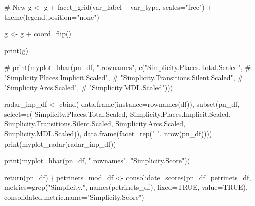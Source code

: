 \documentclass[]{article}
\newenvironment{Shaded}{\begin{snugshade}}{\end{snugshade}}
\newcommand{\KeywordTok}[1]{\textcolor[rgb]{0.94,0.87,0.69}{{#1}}}
\newcommand{\DataTypeTok}[1]{\textcolor[rgb]{0.87,0.87,0.75}{{#1}}}
\newcommand{\StringTok}[1]{\textcolor[rgb]{0.80,0.58,0.58}{{#1}}}
\newcommand{\CommentTok}[1]{\textcolor[rgb]{0.50,0.62,0.50}{{#1}}}
\newcommand{\OtherTok}[1]{\textcolor[rgb]{0.94,0.94,0.56}{{#1}}}
\newcommand{\NormalTok}[1]{\textcolor[rgb]{0.80,0.80,0.80}{{#1}}}
\begin{document}
\begin{Shaded}
\begin{Highlighting}[]
    \CommentTok{# New}
    \NormalTok{g <-}\StringTok{ }\NormalTok{g +}\StringTok{ }\KeywordTok{facet_grid}\NormalTok{(var_label ~}\StringTok{ }\NormalTok{var_type, }\DataTypeTok{scales=}\StringTok{"free"}\NormalTok{) +}\StringTok{ }
\StringTok{             }\KeywordTok{theme}\NormalTok{(}\DataTypeTok{legend.position=}\StringTok{"none"}\NormalTok{)}
    
    \NormalTok{g <-}\StringTok{ }\NormalTok{g +}\StringTok{ }\KeywordTok{coord_flip}\NormalTok{()}

    \KeywordTok{print}\NormalTok{(g)}

\CommentTok{#     print(myplot_hbar(pn_df, ".rownames", c("Simplicity.Places.Total.Scaled",}
\CommentTok{#                                             "Simplicity.Places.Implicit.Scaled",}
\CommentTok{#                                             "Simplicity.Transitions.Silent.Scaled",}
\CommentTok{#                                             "Simplicity.Arcs.Scaled",}
\CommentTok{#                                             "Simplicity.MDL.Scaled")))}

    \NormalTok{radar_inp_df <-}\StringTok{ }\KeywordTok{cbind}\NormalTok{( }\KeywordTok{data.frame}\NormalTok{(}\DataTypeTok{instance=}\KeywordTok{rownames}\NormalTok{(df)),}
                                    \KeywordTok{subset}\NormalTok{(pn_df, }\DataTypeTok{select=}\KeywordTok{c}\NormalTok{( }
                                        \NormalTok{Simplicity.Places.Total.Scaled,}
                                        \NormalTok{Simplicity.Places.Implicit.Scaled,}
                                        \NormalTok{Simplicity.Transitions.Silent.Scaled,}
                                        \NormalTok{Simplicity.Arcs.Scaled,}
                                        \NormalTok{Simplicity.MDL.Scaled)),}
                                    \KeywordTok{data.frame}\NormalTok{(}\DataTypeTok{facet=}\KeywordTok{rep}\NormalTok{(}\StringTok{" "}\NormalTok{, }\KeywordTok{nrow}\NormalTok{(pn_df))))}
    \KeywordTok{print}\NormalTok{(}\KeywordTok{myplot_radar}\NormalTok{(radar_inp_df))}

    \KeywordTok{print}\NormalTok{(}\KeywordTok{myplot_hbar}\NormalTok{(pn_df, }\StringTok{".rownames"}\NormalTok{, }\StringTok{"Simplicity.Score"}\NormalTok{))}
    
    \KeywordTok{return}\NormalTok{(pn_df)}
\NormalTok{\}}
\NormalTok{petrinets_mod_df <-}\StringTok{ }\KeywordTok{consolidate_scores}\NormalTok{(}\DataTypeTok{pn_df=}\NormalTok{petrinets_df, }
        \DataTypeTok{metrics=}\KeywordTok{grep}\NormalTok{(}\StringTok{"Simplicity."}\NormalTok{, }\KeywordTok{names}\NormalTok{(petrinets_df), }\DataTypeTok{fixed=}\OtherTok{TRUE}\NormalTok{, }\DataTypeTok{value=}\OtherTok{TRUE}\NormalTok{), }
        \DataTypeTok{consolidated.metric.name=}\StringTok{"Simplicity.Score"}\NormalTok{)}
\end{Highlighting}
\end{Shaded}
\end{document}
